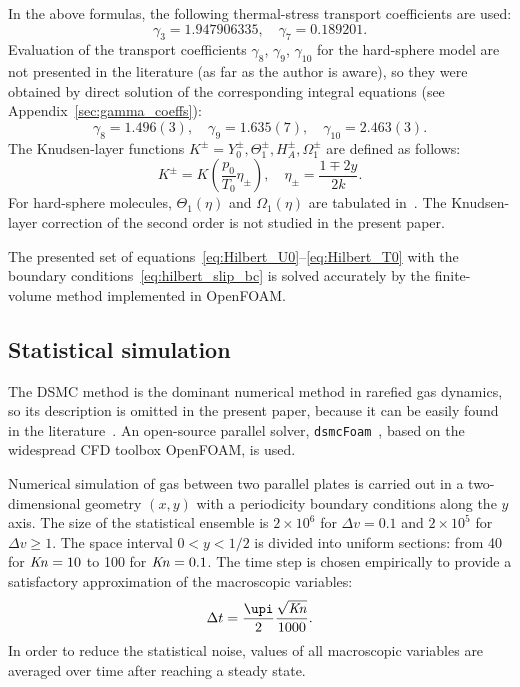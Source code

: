 \documentclass[]{jfm}
\newcommand{\Kn}{\mbox{\textit{Kn}}}
\begin{document}
In the above formulas, the following thermal-stress transport coefficients are used:
\begin{equation}\label{eq:gamma_tabular}
    \gamma_3 = 1.947906335, \quad \gamma_7 = 0.189201.
\end{equation}
Evaluation of the transport coefficients \(\gamma_8\), \(\gamma_9\), \(\gamma_{10}\)
for the hard-sphere model are not presented in the literature (as far as the author is aware),
so they were obtained by direct solution of the corresponding integral equations
(see Appendix~\ref{sec:gamma_coeffs}):
\begin{equation}\label{eq:gamma_numerical}
    \gamma_8 = 1.496(3), \quad \gamma_9 = 1.635(7), \quad \gamma_{10} = 2.463(3).
\end{equation}
The Knudsen-layer functions \(K^\pm = Y_0^\pm, \Theta_1^\pm, H_A^\pm, \Omega_1^\pm\)
are defined as follows:
\begin{equation}\label{eq:nonlinear_knudsen_functions}
     K^\pm = K\left(\frac{p_0}{T_0}\eta_\pm\right), \quad \eta_\pm = \frac{1 \mp 2y}{2k}.
\end{equation}
For hard-sphere molecules, \(\Theta_1(\eta)\) and \(\Omega_1(\eta)\)
are tabulated in~\citet{Ohwada1992, Sone2002, Sone2007}.
The Knudsen-layer correction of the second order is not studied in the present paper.

The presented set of equations~\eqref{eq:Hilbert_U0}--\eqref{eq:Hilbert_T0}
with the boundary conditions~\eqref{eq:hilbert_slip_bc}
is solved accurately by the finite-volume method
implemented in OpenFOAM\textregistered{}.

\subsection{Statistical simulation}

The DSMC method is the dominant numerical method in rarefied gas dynamics,
so its description is omitted in the present paper,
because it can be easily found in the literature~\citep[see e.g.][]{Bird1994, Sone2007}.
An open-source parallel solver, \verb+dsmcFoam+~\citep{Reese2010},
based on the widespread CFD toolbox OpenFOAM\textregistered{}, is used.

Numerical simulation of gas between two parallel plates is carried out
in a two-dimensional geometry \((x,y)\) with a periodicity boundary conditions along the \(y\) axis.
The size of the statistical ensemble is \(2\times10^6\) for \(\Delta{v}=0.1\)
and \(2\times10^5\) for \(\Delta{v}\ge1\).
The space interval \(0<y<1/2\) is divided into uniform sections:
from 40 for \(\Kn=10\) to 100 for \(\Kn=0.1\).
The time step is chosen empirically to provide a satisfactory approximation of the macroscopic variables:
\begin{equation}\label{eq:dsmc_timestep}
    \Delta{t} = \frac{\upi}2 \frac{\sqrt{\Kn}}{1000}.
\end{equation}
In order to reduce the statistical noise, values of all macroscopic variables
are averaged over time after reaching a steady state.
\end{document}
